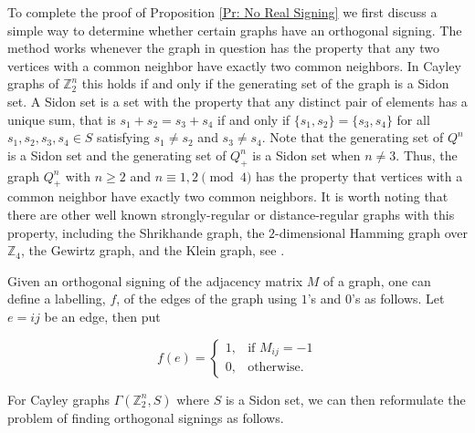 \documentclass[11pt]{article}
\begin{document}
To complete the proof of Proposition \ref{Pr: No Real Signing} we first discuss a simple way to determine whether certain graphs have an orthogonal signing. The method works whenever the graph in question has the property that any two vertices with a common neighbor have exactly two common neighbors. In Cayley graphs of ${\mathbb{Z}_{2}^{n}}$ this holds if and only if the generating set of the graph is a Sidon set.
A Sidon set is a set with the property that any distinct pair of 
elements has a unique sum, that is $s_1+s_2 = s_3 + s_4$ if and only if $\{s_1, s_2\} 
= \{s_3, s_4\}$ for all $s_1, s_2, s_3, s_4 \in S$ satisfying $s_1 \neq s_2$ and $s_3 \neq s_4$. 
Note that the generating set of $Q^n$ is a Sidon set and the generating 
set of $Q_{+}^{n}$ is a Sidon set when $n \neq 3$. Thus, the 
graph $Q_+^n$ with $n \geq 2$ and $n \equiv 1, 2 \pmod{4}$ has the 
property that vertices with a common neighbor have exactly two common 
neighbors. It is worth noting that there are other 
well known strongly-regular or distance-regular graphs 
with this property, including the 
Shrikhande graph, the $2$-dimensional Hamming graph 
over $\mathbb{Z}_4$, the Gewirtz graph, and the Klein graph,
see \cite{BCN}. 

Given an orthogonal signing of the adjacency matrix $M$ of
a graph, one can define a labelling, $f$, of the edges of the graph 
using $1$'s and $0$'s as follows. Let $e = ij$ be an edge, then put

\[
    f(e)= 
\begin{cases}
    1,& \text{if } M_{ij} = -1\\
    0,              & \text{otherwise.}
\end{cases}
\]

    
For Cayley graphs $\Gamma({\mathbb{Z}_{2}^{n}}, S)$ where $S$ is a Sidon set, 
we can then reformulate the problem of finding orthogonal signings as follows.
\end{document}
